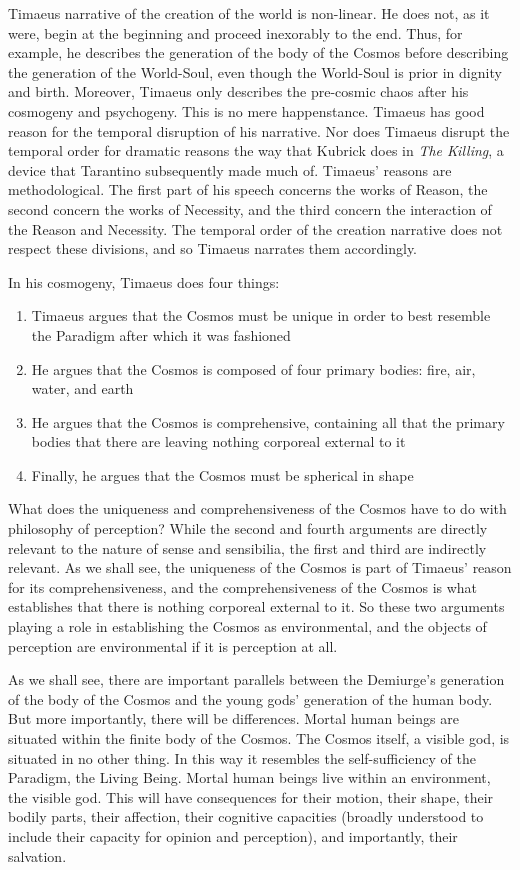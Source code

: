 Timaeus narrative of the creation of the world is non-linear. He does not, as it were, begin at the beginning and proceed inexorably to the end. Thus, for example, he describes the generation of the body of the Cosmos before describing the generation of the World-Soul, even though the World-Soul is prior in dignity and birth. Moreover, Timaeus only describes the pre-cosmic chaos after his cosmogeny and psychogeny. This is no mere happenstance. Timaeus has good reason for the temporal disruption of his narrative. Nor does Timaeus disrupt the temporal order for dramatic reasons the way that Kubrick does in \emph{The Killing}, a device that Tarantino subsequently made much of. Timaeus' reasons are methodological. The first part of his speech concerns the works of Reason, the second concern the works of Necessity, and the third concern the interaction of the Reason and Necessity. The temporal order of the creation narrative does not respect these divisions, and so Timaeus narrates them accordingly.

In his cosmogeny, Timaeus does four things:
\begin{enumerate}[(1)]
	\item Timaeus argues that the Cosmos must be unique in order to best resemble the Paradigm after which it was fashioned
	\item He argues that the Cosmos is composed of four primary bodies: fire, air, water, and earth
	\item He argues that the Cosmos is comprehensive, containing all that the primary bodies that there are leaving nothing corporeal external to it
	\item Finally, he argues that the Cosmos must be spherical in shape
\end{enumerate}
What does the uniqueness and comprehensiveness of the Cosmos have to do with philosophy of perception? While the second and fourth arguments are directly relevant to the nature of sense and sensibilia, the first and third are indirectly relevant. As we shall see, the uniqueness of the Cosmos is part of Timaeus' reason for its comprehensiveness, and the comprehensiveness of the Cosmos is what establishes that there is nothing corporeal external to it. So these two arguments playing a role in establishing the Cosmos as environmental, and the objects of perception are environmental if it is perception at all.

As we shall see, there are important parallels between the Demiurge's generation of the body of the Cosmos and the young gods' generation of the human body. But more importantly, there will be differences. Mortal human beings are situated within the finite body of the Cosmos. The Cosmos itself, a visible god, is situated in no other thing. In this way it resembles the self-sufficiency of the Paradigm, the Living Being. Mortal human beings live within an environment, the visible god. This will have consequences for their motion, their shape, their bodily parts, their affection, their cognitive capacities (broadly understood to include their capacity for opinion and perception), and importantly, their salvation.

